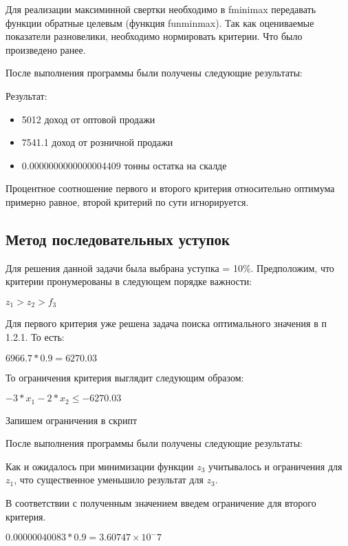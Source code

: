 \documentclass[14pt,a4paper,report]{report}
\begin{document}
Для реализации максиминной свертки необходимо в fminimax передавать функции обратные целевым (функция funminmax). Так как оцениваемые показатели разновелики, необходимо нормировать критерии. Что было произведено ранее.




После выполнения программы были получены следующие результаты:



Результат:
\begin{itemize}
\item 5012 доход от оптовой продажи
\item 7541.1 доход от розничной продажи
\item 0.0000000000000004409 тонны остатка на скалде
\end{itemize}

Процентное соотношение первого и второго критерия относительно оптимума примерно равное, второй критерий по сути игнорируется.





\subsection{Метод последовательных уступок}
Для решения данной задачи была выбрана уступка = 10\%. 	Предположим, что критерии пронумерованы в следующем порядке важности:
\begin{center}
$z_1>z_2>f_3$
\end{center} 
Для первого критерия уже решена задача поиска оптимального значения в п 1.2.1. То есть:
\begin{center}
$6966.7 * 0.9 = 6270.03$
\end{center}
То ограничения критерия выглядит следующим образом:
\begin{center}
$-3*x_{1}-2*x_{2}\leq -6270.03$
\end{center}


Запишем ограничения в скрипт


После выполнения программы были получены следующие результаты:



Как и ожидалось при минимизации функции $z_3$ учитывалось и ограничения для $z_1$, что существенное уменьшило результат для $z_3$.

В соответствии с полученным значением введем ограничение для второго критерия.

\begin{center}
$ 0.00000040083 * 0.9 = 3.60747 × 10^-7 $
\end{center}
\end{document}
